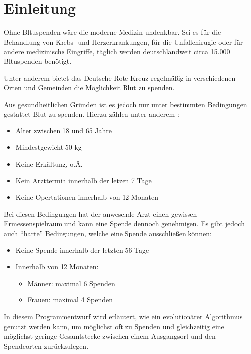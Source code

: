 \section{Einleitung}\label{sec:einleitung}
Ohne Bltuspenden wäre die moderne Medizin undenkbar.
Sei es für die Behandlung von Krebs- und Herzerkrankungen,
für die Unfallchirugie oder für andere medizinische Eingriffe,
täglich werden deutschlandweit circa 15.000 Bltuspenden benötigt. \cite{FragenAn98:online}

Unter anderem bietet das Deutsche Rote Kreuz regelmäßig in verschiedenen Orten und Gemeinden die Möglichkeit Blut zu spenden.

Aus gesundheitlichen Gründen ist es jedoch nur unter bestimmten Bedingungen gestattet Blut zu spenden.
Hierzu zählen unter anderem \cite{SpendeCh65:online}:
\begin{itemize}
    \setlength\itemsep{-0.5em}
    \item Alter zwischen 18 und 65 Jahre
    \item Mindestgewicht 50 kg
    \item Keine Erkältung, o.Ä.
    \item Kein Arzttermin innerhalb der letzen 7 Tage
    \item Keine Opertationen innerhalb von 12 Monaten
\end{itemize}

Bei diesen Bedingungen hat der anwesende Arzt einen gewissen Ermessenspielraum und kann eine Spende dennoch genehmigen.
Es gibt jedoch auch \enquote{harte} Bedingungen, welche eine Spende ausschließen können:

\begin{itemize}
    \setlength\itemsep{-0.5em}
    \item Keine Spende innerhalb der letzten 56 Tage
    \item Innerhalb von 12 Monaten: \begin{itemize}
        \vspace{-1em}
        \setlength\itemsep{-0.5em}
        \item Männer:  maximal 6 Spenden
        \item Frauen:  maximal 4 Spenden
    \end{itemize}
\end{itemize}

In diesem Programmentwurf wird erläutert,
wie ein evolutionärer Algorithmus genutzt werden kann,
um möglichst oft zu Spenden und
gleichzeitig eine möglichst geringe Gesamtstecke zwischen einem Ausgangsort und den Spendeorten zurückzulegen.
